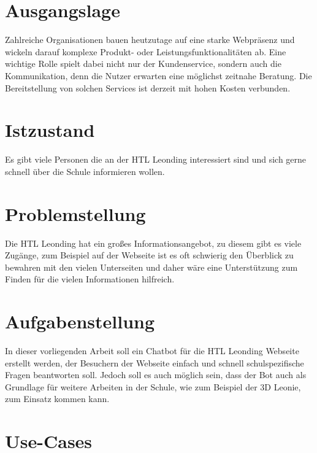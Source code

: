 \section{Ausgangslage}
Zahlreiche Organisationen bauen heutzutage auf eine starke Webpräsenz und wickeln darauf komplexe Produkt- oder Leistungsfunktionalitäten ab.
Eine wichtige Rolle spielt dabei nicht nur der Kundenservice, sondern auch die Kommunikation, denn die Nutzer erwarten eine möglichst zeitnahe Beratung.
Die Bereitstellung von solchen Services ist derzeit mit hohen Kosten verbunden.

\section{Istzustand}
Es gibt viele Personen die an der HTL Leonding interessiert sind und sich gerne schnell über die Schule informieren wollen.


\section{Problemstellung}
Die HTL Leonding hat ein großes Informationsangebot, zu diesem gibt es viele Zugänge, zum Beispiel auf der Webseite ist es oft schwierig den Überblick zu bewahren mit den vielen Unterseiten und daher wäre eine Unterstützung zum Finden für die vielen Informationen hilfreich.

\section{Aufgabenstellung}
In dieser vorliegenden Arbeit soll ein Chatbot für die HTL Leonding Webseite erstellt werden, der Besuchern der Webseite einfach und schnell schulspezifische Fragen beantworten soll.
Jedoch soll es auch möglich sein, dass der Bot auch als Grundlage für weitere Arbeiten in der Schule, wie zum Beispiel der 3D Leonie, zum Einsatz kommen kann.

\section{Use-Cases}


